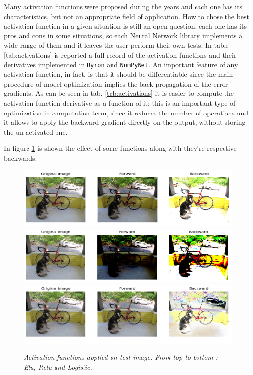 \documentclass[12pt,a4paper]{report}
\begin{document}
Many activation functions were proposed during the years and each one has its characteristics, but not an appropriate field of application. 
How to chose the best activation function in a given situation is still an open question: each one has its pros and cons in some situations, so each Neural Network library implements a wide range of them and it leaves the user perform their own tests.
In table \ref{tab:activations} is reported a full record of the activation functions and their derivatives implemented in {\tt Byron} and {\tt NumPyNet}.
An important feature of any activation function, in fact, is that it should be differentiable since the main procedure of model optimization implies the back-propagation of the error gradients.
As can be seen in tab. \ref{tab:activations} it is easier to compute the activation function derivative as a function of it: this is an important type of optimization in computation term, since it reduces the number of operations and it allows to apply the backward gradient directly on the output, without storing the un-activated one.

In figure \ref{fig:activations} is shown the effect of some functions along with they're respective backwards.

\begin{figure}[H]
 \includegraphics[scale=0.5]{./images/activation_elu}
 \includegraphics[scale=0.5]{./images/activation_relu.png}
 \includegraphics[scale=0.5]{./images/activation_logistic.png}
 \caption{\it Activation functions applied on test image. From top to bottom : Elu, Relu and Logistic.}
 \label{fig:activations}
\end{figure}
\end{document}
